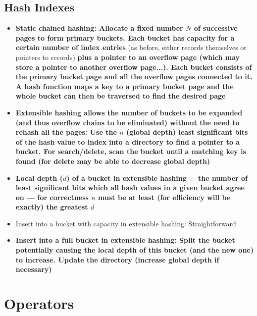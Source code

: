 \documentclass[20pt,a4paper,landscape]{extarticle}
\begin{document}
\begin{flushleft}
\subsection{Hash Indexes}
\begin{itemize}
\item \textbf{Static chained hashing: Allocate a fixed number \boldmath$N$ of successive pages to form primary buckets. Each bucket has capacity for a certain number of index entries} (as before, either records themselves or pointers to records) \textbf{plus a pointer to an overflow page (which may store a pointer to another overflow page...). Each bucket consists of the primary bucket page and all the overflow pages connected to it. A hash function maps a key to a primary bucket page and the whole bucket can then be traversed to find the desired page}
\item \textbf{Extensible hashing allows the number of buckets to be expanded (and thus overflow chains to be eliminated) without the need to rehash all the pages: Use the \boldmath$n$ (global depth) least significant bits of the hash value to index into a directory to find a pointer to a bucket. For search/delete, scan the bucket until a matching key is found (for delete may be able to decrease global depth)}
\item \textbf{Local depth (\boldmath$d$) of a bucket in extensible hashing = the number of least significant bits which all hash values in a given bucket agree on — for correctness $n$ must be at least (for efficiency will be exactly) the greatest $d$}
\item Insert into a bucket with capacity in extensible hashing: Straightforward
\item \textbf{Insert into a full bucket in extensible hashing: Split the bucket potentially causing the local depth of this bucket (and the new one) to increase. Update the directory (increase global depth if necessary)}
\end{itemize}
\section{Operators}

\end{flushleft}
\end{document}
